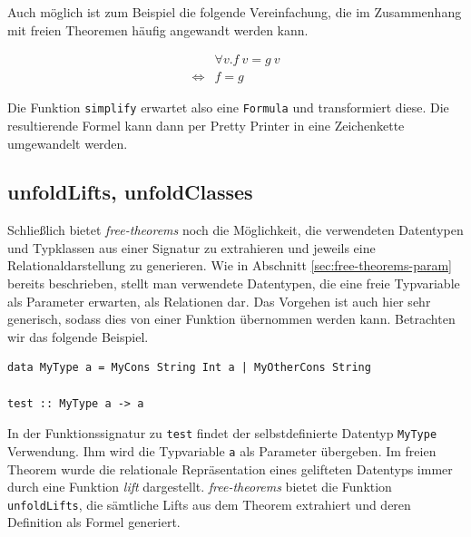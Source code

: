Auch möglich ist zum Beispiel die folgende Vereinfachung, die im Zusammenhang mit freien Theoremen häufig angewandt werden
kann.

\begin{align*}
&\forall v . f\ v = g\ v\\
\Leftrightarrow & f = g
\end{align*}

Die Funktion \texttt{simplify} erwartet also eine \texttt{Formula} und transformiert diese. Die resultierende Formel kann
dann per Pretty Printer in eine Zeichenkette umgewandelt werden.



\subsection{unfoldLifts, unfoldClasses}


Schließlich bietet \textit{free-theorems} noch die Möglichkeit, die verwendeten Datentypen und Typklassen aus einer
Signatur zu extrahieren und jeweils eine Relationaldarstellung zu generieren. Wie in Abschnitt \ref{sec:free-theorems-param}
bereits beschrieben, stellt man verwendete Datentypen, die eine freie Typvariable als Parameter erwarten, als Relationen
dar. Das Vorgehen ist auch hier sehr generisch, sodass dies von einer Funktion übernommen werden kann. Betrachten wir
das folgende Beispiel.

\begin{verbatim}
data MyType a = MyCons String Int a | MyOtherCons String

test :: MyType a -> a
\end{verbatim}

In der Funktionssignatur zu \texttt{test} findet der selbstdefinierte Datentyp \texttt{MyType} Verwendung. Ihm wird die
Typvariable \texttt{a} als Parameter übergeben. Im freien Theorem wurde die relationale Repräsentation eines gelifteten
Datentyps immer durch eine Funktion \textit{lift} dargestellt. \textit{free-theorems} bietet die Funktion \texttt{unfoldLifts},
die sämtliche Lifts aus dem Theorem extrahiert und deren Definition als Formel generiert.

